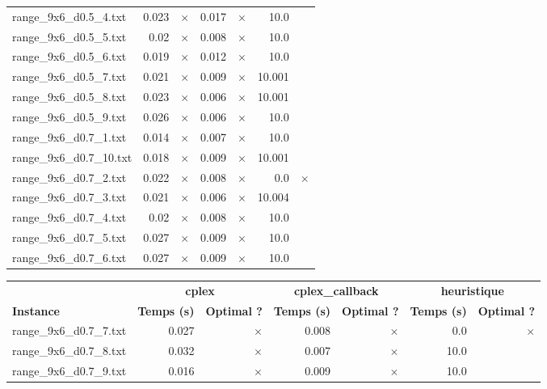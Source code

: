 \documentclass{article}
\begin{document}
\begin{center}
\begin{tabular}{lrrrrrr}
range\_9x6\_d0.5\_4.txt & 0.023 & 
$\times$
 & 0.017 & 
$\times$
 & 10.0 & 
\\
range\_9x6\_d0.5\_5.txt & 0.02 & 
$\times$
 & 0.008 & 
$\times$
 & 10.0 & 
\\
range\_9x6\_d0.5\_6.txt & 0.019 & 
$\times$
 & 0.012 & 
$\times$
 & 10.0 & 
\\
range\_9x6\_d0.5\_7.txt & 0.021 & 
$\times$
 & 0.009 & 
$\times$
 & 10.001 & 
\\
range\_9x6\_d0.5\_8.txt & 0.023 & 
$\times$
 & 0.006 & 
$\times$
 & 10.001 & 
\\
range\_9x6\_d0.5\_9.txt & 0.026 & 
$\times$
 & 0.006 & 
$\times$
 & 10.0 & 
\\
range\_9x6\_d0.7\_1.txt & 0.014 & 
$\times$
 & 0.007 & 
$\times$
 & 10.0 & 
\\
range\_9x6\_d0.7\_10.txt & 0.018 & 
$\times$
 & 0.009 & 
$\times$
 & 10.001 & 
\\
range\_9x6\_d0.7\_2.txt & 0.022 & 
$\times$
 & 0.008 & 
$\times$
 & 0.0 & 
$\times$
\\
range\_9x6\_d0.7\_3.txt & 0.021 & 
$\times$
 & 0.006 & 
$\times$
 & 10.004 & 
\\
range\_9x6\_d0.7\_4.txt & 0.02 & 
$\times$
 & 0.008 & 
$\times$
 & 10.0 & 
\\
range\_9x6\_d0.7\_5.txt & 0.027 & 
$\times$
 & 0.009 & 
$\times$
 & 10.0 & 
\\
range\_9x6\_d0.7\_6.txt & 0.027 & 
$\times$
 & 0.009 & 
$\times$
 & 10.0 & 
\\
\hline\end{tabular}
\end{center}

\newpage
\begin{center}
\renewcommand{\arraystretch}{1.4} 
 \begin{tabular}{lrrrrrr}
	\hline
 & \multicolumn{2}{c}{\textbf{cplex}} & \multicolumn{2}{c}{\textbf{cplex_callback}} & \multicolumn{2}{c}{\textbf{heuristique}}\\
\textbf{Instance}  & \textbf{Temps (s)} & \textbf{Optimal ?}  & \textbf{Temps (s)} & \textbf{Optimal ?}  & \textbf{Temps (s)} & \textbf{Optimal ?} \\\hline

range\_9x6\_d0.7\_7.txt & 0.027 & 
$\times$
 & 0.008 & 
$\times$
 & 0.0 & 
$\times$
\\
range\_9x6\_d0.7\_8.txt & 0.032 & 
$\times$
 & 0.007 & 
$\times$
 & 10.0 & 
\\
range\_9x6\_d0.7\_9.txt & 0.016 & 
$\times$
 & 0.009 & 
$\times$
 & 10.0 & 
\\
\hline\end{tabular}
\end{center}
\end{document}
